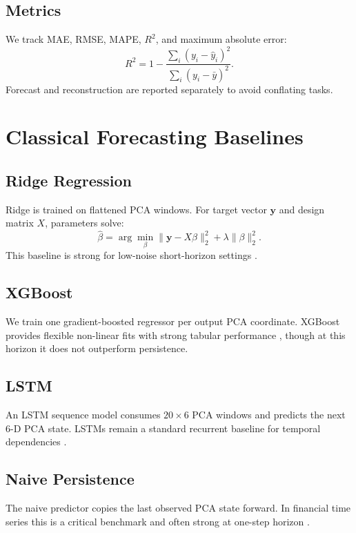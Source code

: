 \documentclass[11pt]{article}
\begin{document}
\subsection{Metrics}
We track MAE, RMSE, MAPE, \(R^2\), and maximum absolute error:
\begin{equation}
R^2 = 1-\frac{\sum_i (y_i-\hat{y}_i)^2}{\sum_i (y_i-\bar{y})^2}.
\end{equation}
Forecast and reconstruction are reported separately to avoid conflating tasks.

\section{Classical Forecasting Baselines}
\subsection{Ridge Regression}
Ridge is trained on flattened PCA windows. For target vector \(\mathbf{y}\) and design matrix \(X\), parameters solve:
\begin{equation}
\hat{\beta}=\arg\min_{\beta}\lVert \mathbf{y}-X\beta\rVert_2^2+\lambda\lVert\beta\rVert_2^2.
\end{equation}
This baseline is strong for low-noise short-horizon settings \cite{hoerl1970ridge}.

\subsection{XGBoost}
We train one gradient-boosted regressor per output PCA coordinate. XGBoost provides flexible non-linear fits with strong tabular performance \cite{chen2016xgboost}, though at this horizon it does not outperform persistence.

\subsection{LSTM}
An LSTM sequence model consumes \(20 \times 6\) PCA windows and predicts the next 6-D PCA state. LSTMs remain a standard recurrent baseline for temporal dependencies \cite{hochreiter1997lstm}.

\subsection{Naive Persistence}
The naive predictor copies the last observed PCA state forward. In financial time series this is a critical benchmark and often strong at one-step horizon \cite{fama1970efficient}.
\end{document}
